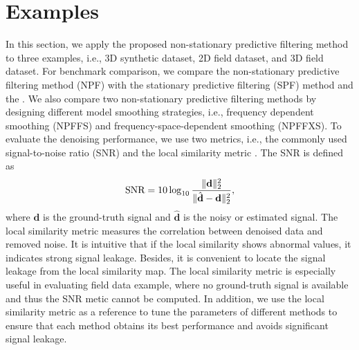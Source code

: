 \section{Examples}
In this section, we apply the proposed non-stationary predictive filtering method to three examples, i.e., 3D synthetic dataset, 2D field dataset, and 3D field dataset. For benchmark comparison, we compare the non-stationary predictive filtering method (NPF) with the stationary predictive filtering (SPF) method and the . We also compare two non-stationary predictive filtering methods by designing different model smoothing strategies, i.e., frequency dependent smoothing (NPFFS) \cite{wanghang2021geo} and frequency-space-dependent smoothing (NPFFXS). To evaluate the denoising performance, we use two metrics, i.e., the commonly used signal-to-noise ratio (SNR) \cite{guochang2009,weilin2018} and the local similarity metric \cite{fomel2007localattr,yangkang2015ortho}. The SNR is defined as 
\begin{equation}
\label{eq:diff}
\text{SNR}=10\log_{10}\frac{\Arrowvert \mathbf{d} \Arrowvert_2^2}{\Arrowvert \hat{\mathbf{d}} -\mathbf{d}\Arrowvert_2^2},
\end{equation}
where $\mathbf{d}$ is the ground-truth signal and $\hat{\mathbf{d}}$ is the noisy or estimated signal. The local similarity metric measures the correlation between denoised data and removed noise. It is intuitive that if the local similarity shows abnormal values, it indicates strong signal leakage. Besides, it is convenient to locate the signal leakage from the local similarity map. The local similarity metric is especially useful in evaluating field data example, where no ground-truth signal is available and thus the SNR metic cannot be computed. In addition, we use the local similarity metric as a reference to tune the parameters of different methods to ensure that each method obtains its best performance and avoids significant signal leakage. 

